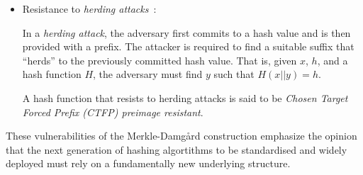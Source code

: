 \begin{itemize}
\item Resistance to \emph{herding attacks}~\cite{HH06}:
  \begin{defn} In a \emph{herding attack}, the adversary first commits to a hash value and is then provided with a prefix. The attacker is required to find a suitable suffix that “herds” to the previously committed hash value. That is, given $x$, $h$, and a hash function $H$, the adversary must find $y$ such that $H(x\vert \vert y)=h$.

    A hash function that resists to herding attacks is said to be \emph{Chosen Target Forced Prefix (CTFP) preimage resistant}.
  \end{defn}
\end{itemize}

\vspace{.5cm}

 These vulnerabilities of the Merkle-Damg\r{a}rd construction emphasize the opinion that the next generation of hashing algortithms to be standardised and widely deployed must rely on a fundamentally new underlying structure. 
